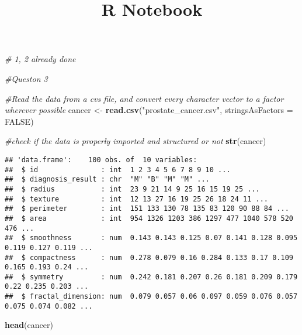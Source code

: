 \documentclass[]{article}
\title{R Notebook}
\author{}
\date{}
\newenvironment{Shaded}{\begin{snugshade}}{\end{snugshade}}
\newcommand{\KeywordTok}[1]{\textcolor[rgb]{0.13,0.29,0.53}{\textbf{#1}}}
\newcommand{\DataTypeTok}[1]{\textcolor[rgb]{0.13,0.29,0.53}{#1}}
\newcommand{\StringTok}[1]{\textcolor[rgb]{0.31,0.60,0.02}{#1}}
\newcommand{\CommentTok}[1]{\textcolor[rgb]{0.56,0.35,0.01}{\textit{#1}}}
\newcommand{\OtherTok}[1]{\textcolor[rgb]{0.56,0.35,0.01}{#1}}
\newcommand{\NormalTok}[1]{#1}
\begin{document}
\maketitle

\begin{Shaded}
\begin{Highlighting}[]
\CommentTok{# 1, 2 already done}
\end{Highlighting}
\end{Shaded}

\begin{Shaded}
\begin{Highlighting}[]
\CommentTok{#Queston 3}

\CommentTok{#Read the data from a cvs file, and convert every character vector to a factor wherever possible}
\NormalTok{cancer <-}\StringTok{ }\KeywordTok{read.csv}\NormalTok{(}\StringTok{"prostate_cancer.csv"}\NormalTok{, }\DataTypeTok{stringsAsFactors =} \OtherTok{FALSE}\NormalTok{)}

\CommentTok{#check if the data is properly imported and structured or not}
\KeywordTok{str}\NormalTok{(cancer)}
\end{Highlighting}
\end{Shaded}

\begin{verbatim}
## 'data.frame':    100 obs. of  10 variables:
##  $ id               : int  1 2 3 4 5 6 7 8 9 10 ...
##  $ diagnosis_result : chr  "M" "B" "M" "M" ...
##  $ radius           : int  23 9 21 14 9 25 16 15 19 25 ...
##  $ texture          : int  12 13 27 16 19 25 26 18 24 11 ...
##  $ perimeter        : int  151 133 130 78 135 83 120 90 88 84 ...
##  $ area             : int  954 1326 1203 386 1297 477 1040 578 520 476 ...
##  $ smoothness       : num  0.143 0.143 0.125 0.07 0.141 0.128 0.095 0.119 0.127 0.119 ...
##  $ compactness      : num  0.278 0.079 0.16 0.284 0.133 0.17 0.109 0.165 0.193 0.24 ...
##  $ symmetry         : num  0.242 0.181 0.207 0.26 0.181 0.209 0.179 0.22 0.235 0.203 ...
##  $ fractal_dimension: num  0.079 0.057 0.06 0.097 0.059 0.076 0.057 0.075 0.074 0.082 ...
\end{verbatim}

\begin{Shaded}
\begin{Highlighting}[]
\KeywordTok{head}\NormalTok{(cancer)}
\end{Highlighting}
\end{Shaded}
\end{document}
